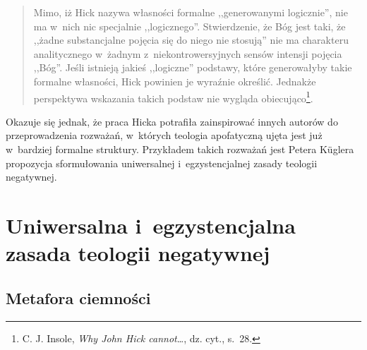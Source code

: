 \begin{quote}
Mimo, iż Hick nazywa własności formalne ,,generowanymi logicznie'', nie ma w~nich nic specjalnie ,,logicznego''. Stwierdzenie, że Bóg jest taki, że ,,żadne substancjalne pojęcia się do niego nie stosują'' nie ma charakteru analitycznego w~żadnym z~niekontrowersyjnych sensów intensji pojęcia ,,Bóg''. Jeśli istnieją jakieś ,,logiczne'' podstawy, które generowałyby takie formalne własności, Hick powinien je wyraźnie określić. Jednakże perspektywa wskazania takich podstaw nie wygląda obiecująco\footnote{C. J. Insole, \textit{Why John Hick cannot}\ldots, dz. cyt., s.~28.}.
\end{quote}
Okazuje się jednak, że praca Hicka potrafiła zainspirować innych autorów do przeprowadzenia rozważań, w~których teologia apofatyczną ujęta jest już w~bardziej formalne struktury. Przykładem takich rozważań jest Petera Küglera propozycja sformułowania uniwersalnej i~egzystencjalnej zasady teologii negatywnej.









\chapter{Uniwersalna i~egzystencjalna zasada teologii negatywnej}


\section{Metafora ciemności}

